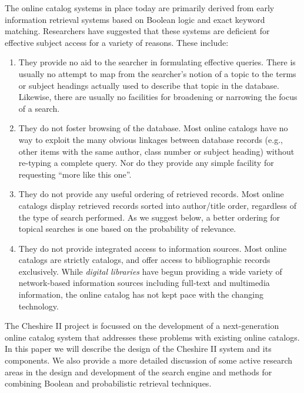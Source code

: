 The online catalog systems in place today are primarily derived from
early information retrieval systems based on Boolean logic and exact
keyword matching. Researchers have suggested that these systems are
deficient for effective subject access for a variety of reasons\cite{HILDRETH}.
These include:

\begin{enumerate}

\item They provide no aid to the searcher in formulating effective
queries. There is usually no attempt to map from the searcher's notion
of a topic to the terms or subject headings actually used to describe
that topic in the database. Likewise, there are usually no facilities
for broadening or narrowing the focus of a search.

\item They do not foster browsing of the database. Most online catalogs 
have no way to exploit the many obvious linkages between database records
(e.g., other items with the same author, class number or subject heading)
without re-typing a complete query. Nor do they provide any simple facility
for requesting ``more like this one''.

\item They do not provide any useful ordering of retrieved records.
Most online catalogs display retrieved records sorted into
author/title order, regardless of the type of search performed. As we
suggest below, a better ordering for topical searches is one based on
the probability of relevance.

\item They do not provide integrated access to information sources. Most
online catalogs are strictly catalogs, and offer access to
bibliographic records exclusively. While {\em digital libraries}
\cite{DIGLIB} have begun providing
a wide variety of network-based information sources including
full-text and multimedia information, the online catalog has not kept
pace with the changing technology.

\end{enumerate}

The Cheshire II project is focussed on the development of a
next-generation online catalog system that addresses these problems
with existing online catalogs. In this paper we will describe the
design of the Cheshire II system and its components. We also
provide a more detailed discussion of some active research 
areas in the design and development of the search engine and 
methods for combining Boolean and probabilistic retrieval techniques.

